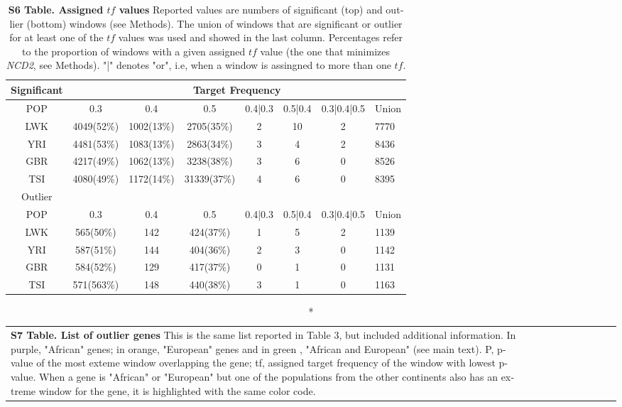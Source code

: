 \begin{refsection}
\begin{otherlanguage}{english}
\begin{table}[!ht]
\centering
\footnotesize
\caption*{\textbf{S6 Table. Assigned $tf$ values} Reported values are numbers of significant (top) and outlier (bottom) windows (see Methods). The union of windows that are significant or outlier for at least one of the $tf$ values was used and showed in the last column. Percentages refer to the proportion of windows with a given assigned $tf$ value (the one that minimizes \emph{NCD2}, see Methods). "|" denotes "or", i.e, when a window is assingned to more than one $tf$.}
\label{tab:assignedtf}
\begin{tabular}{@{}cccccccl@{}}
\rowcolor[HTML]{EFEFEF} 
Significant & \multicolumn{7}{c}{\cellcolor[HTML]{EFEFEF}Target Frequency} \\ \midrule
\rowcolor[HTML]{C0C0C0} 
POP & 0.3 & 0.4 & 0.5 & 0.4|0.3 & 0.5|0.4 & 0.3|0.4|0.5 & Union \\ 
LWK & 4049(52\%) & 1002(13\%) & 2705(35\%) & 2 & 10 & 2 & 7770 \\
YRI & 4481(53\%) & 1083(13\%) & 2863(34\%) & 3 & 4 & 2 & 8436 \\
GBR & 4217(49\%) & 1062(13\%) & 3238(38\%) & 3 & 6 & 0 & 8526 \\
TSI & 4080(49\%) & 1172(14\%) & 31339(37\%) & 4 & 6 & 0 & 8395 \\
\cellcolor[HTML]{EFEFEF}Outlier & \multicolumn{1}{l}{} & \multicolumn{1}{l}{} & \multicolumn{1}{l}{} & \multicolumn{1}{l}{} & \multicolumn{1}{l}{} & \multicolumn{1}{l}{} &  \\
\rowcolor[HTML]{C0C0C0} 
POP & 0.3 & 0.4 & 0.5 & 0.4|0.3 & 0.5|0.4 & 0.3|0.4|0.5 & Union \\
LWK & 565(50\%) & 142 & 424(37\%) & 1 & 5 & 2 & 1139 \\
YRI & 587(51\%) & 144 & 404(36\%) & 2 & 3 & 0 & 1142 \\
GBR & 584(52\%) & 129 & 417(37\%) & 0 & 1 & 0 & 1131 \\
TSI & 571(563\%) & 148 & 440(38\%) & 3 & 1 & 0 & 1163 \\ \bottomrule
\end{tabular}
\end{table}

\medskip

\begin{scriptsize}
\begin{longtable}{llllllllll}
\caption*{\textbf{S7 Table. List of outlier genes} This is the same list reported in Table 3, but included additional information. In purple, "African" genes; in orange, "European" genes and in green , "African and European" (see main text). P, p-value of the most exteme window overlapping the gene; tf, assigned target frequency of the window with lowest p-value. When a gene is "African" or "European" but one of the populations from the other continents also has an extreme window for the gene, it is highlighted with the same color code. }\\




\end{longtable}
\end{scriptsize}
\end{otherlanguage}
\end{refsection}
